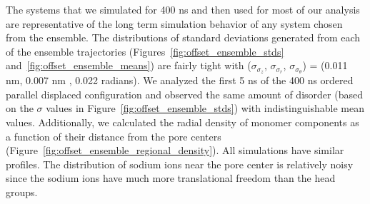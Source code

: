 \documentclass[journal=jpcbfk,manuscript=article]{achemso}
\begin{document}
  The systems that we simulated for 400 ns and then used for most of our
  analysis are representative of the long term simulation behavior of any
  system chosen from the ensemble. The distributions of standard deviations 
  generated from each of the ensemble trajectories 
  (Figures~\ref{fig:offset_ensemble_stds} and~\ref{fig:offset_ensemble_means}) 
  are fairly tight with ($\sigma_{\sigma_z}$, $\sigma_{\sigma_r}$, $
  \sigma_{\sigma_\theta}$) = (0.011 nm, 0.007 nm , 0.022 radians).
  We analyzed the first 5 ns of the 400 ns ordered parallel displaced
  configuration and observed the same amount of disorder (based on the $\sigma$
  values in Figure~\ref{fig:offset_ensemble_stds}) with indistinguishable 
  mean values. Additionally, we calculated the radial density of monomer
  components as a function of their distance from the pore centers 
  (Figure~\ref{fig:offset_ensemble_regional_density}).
  All simulations have similar profiles. The distribution of sodium ions near the
  pore center is relatively noisy since the sodium ions have much more 
  translational freedom than the head groups. 
  
\end{document}
